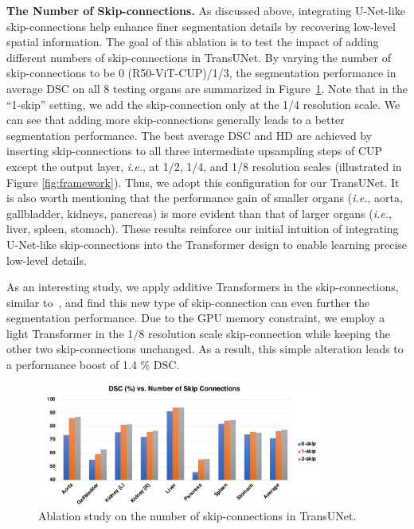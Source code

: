 \documentclass[runningheads]{llncs}
\begin{document}
\vspace{1ex}\noindent\textbf{The Number of Skip-connections.}
As discussed above, integrating U-Net-like skip-connections help enhance finer segmentation details by recovering low-level spatial information. The goal of this ablation is to test the impact of adding different numbers of skip-connections in TransUNet. 
By varying the number of skip-connections to be 0 (R50-ViT-CUP)/1/3, the segmentation performance in average DSC on all 8 testing organs are summarized in Figure~\ref{fig:abl:skip}.
Note that in the ``1-skip'' setting, we add the skip-connection only at the 1/4 resolution scale.
We can see that adding more skip-connections generally leads to a better segmentation performance. 
The best average DSC and HD are achieved by inserting skip-connections to all three intermediate upsampling steps of CUP except the output layer, \emph{i.e.}, at 1/2, 1/4, and 1/8 resolution scales (illustrated in Figure \ref{fig:framework}). 
Thus, we adopt this configuration for our TransUNet. 
It is also worth mentioning that the performance gain of smaller organs (\emph{i.e.}, aorta, gallbladder, kidneys, pancreas) is more evident than that of larger organs (\emph{i.e.}, liver, spleen, stomach).
These results reinforce our initial intuition of integrating U-Net-like skip-connections into the Transformer design to enable learning precise low-level details. 


As an interesting study, we apply additive Transformers in the skip-connections, similar to~\cite{schlemper2019attention}, and find this new type of skip-connection can even further the segmentation performance. 
Due to the GPU memory constraint, we employ a light Transformer in the 1/8 resolution scale skip-connection while keeping the other two skip-connections unchanged. As a result, this simple alteration leads to a performance boost of 1.4 \% DSC. 


\begin{figure}
    \centering
    \includegraphics[width=0.85\textwidth]{skip-ablation.pdf}
    \caption{Ablation study on the number of skip-connections in TransUNet.}
    \label{fig:abl:skip}
\end{figure}
\end{document}
